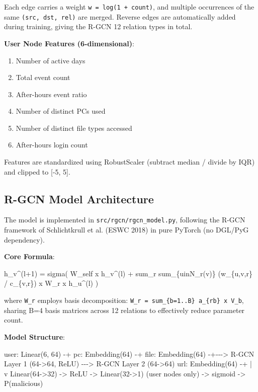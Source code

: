 \documentclass[
  a4paper,
  11pt]{article}
\newenvironment{Shaded}{}{}
\newcommand{\NormalTok}[1]{#1}
\providecommand{\tightlist}{%
  \setlength{\itemsep}{0pt}\setlength{\parskip}{0pt}}
\begin{document}
Each edge carries a weight \texttt{w\ =\ log(1\ +\ count)}, and multiple
occurrences of the same \texttt{(src,\ dst,\ rel)} are merged. Reverse
edges are automatically added during training, giving the R-GCN 12
relation types in total.

\textbf{User Node Features (6-dimensional)}:

\begin{enumerate}
\def\labelenumi{\arabic{enumi}.}
\tightlist
\item
  Number of active days
\item
  Total event count
\item
  After-hours event ratio
\item
  Number of distinct PCs used
\item
  Number of distinct file types accessed
\item
  After-hours login count
\end{enumerate}

Features are standardized using RobustScaler (subtract median / divide
by IQR) and clipped to {[}-5, 5{]}.

\subsection{R-GCN Model Architecture}\label{r-gcn-model-architecture}

The model is implemented in \texttt{src/rgcn/rgcn\_model.py}, following
the R-GCN framework of Schlichtkrull et al. (ESWC 2018) in pure PyTorch
(no DGL/PyG dependency).

\textbf{Core Formula}:

\begin{Shaded}
\begin{Highlighting}[]
\NormalTok{h\_v\^{}(l+1) = sigma( W\_self x h\_v\^{}(l) + sum\_r sum\_\{uinN\_r(v)\} (w\_\{u,v,r\} / c\_\{v,r\}) x W\_r x h\_u\^{}(l) )}
\end{Highlighting}
\end{Shaded}

where \texttt{W\_r} employs basis decomposition:
\texttt{W\_r\ =\ sum\_\{b=1..B\}\ a\_\{rb\}\ x\ V\_b}, sharing B=4 basis
matrices across 12 relations to effectively reduce parameter count.

\textbf{Model Structure}:

\begin{Shaded}
\begin{Highlighting}[]
\NormalTok{user: Linear(6, 64)  {-}+}
\NormalTok{pc:   Embedding(64)   {-}+}
\NormalTok{file: Embedding(64)   {-}+{-}{-}{-}\textgreater{} R{-}GCN Layer 1 (64{-}\textgreater{}64, ReLU) {-}{-}{-}\textgreater{} R{-}GCN Layer 2 (64{-}\textgreater{}64)}
\NormalTok{url:  Embedding(64)   {-}+                                          |}
\NormalTok{                                                                   v}
\NormalTok{                                                    Linear(64{-}\textgreater{}32) {-}\textgreater{} ReLU {-}\textgreater{} Linear(32{-}\textgreater{}1)}
\NormalTok{                                                    (user nodes only)    {-}\textgreater{} sigmoid {-}\textgreater{} P(malicious)}
\end{Highlighting}
\end{Shaded}
\end{document}
